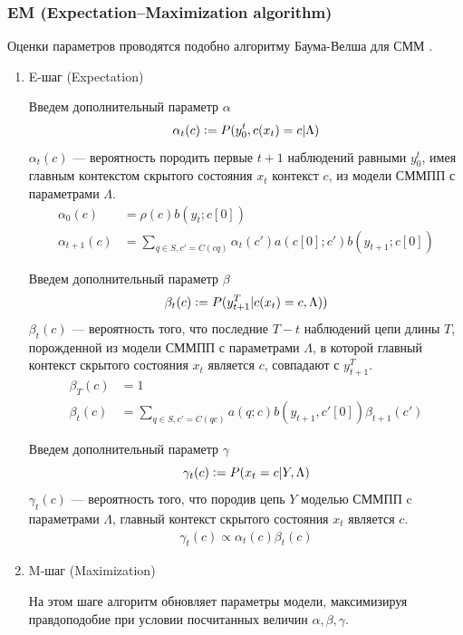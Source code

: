 \documentclass{matmex-diploma-custom}
\begin{document}
\subsubsection{EM (Expectation–Maximization algorithm)}
Оценки параметров проводятся подобно алгоритму Баума-Велша для СММ \cite{Rabiner1989}.
\begin{enumerate}
\item E-шаг (Expectation)

Введем дополнительный параметр $\alpha$
$$ \alpha_{t}(c) \mathrel{\mathop:}= P(y_{0}^{t}, c(x_{t})=c| \Lambda)$$
$\alpha_{t}(c)$ --- вероятность породить первые $t+1$ наблюдений равными $y_{0}^{t}$, имея главным контекстом  скрытого состояния $x_{t}$ контекст $ c $, из модели СММПП с параметрами $\Lambda$.
\begin{align}
\alpha_{0}(c) &= \rho(c)b(y_{t}; c[0]) \nonumber \\
\alpha_{t+1}(c) &= \sum_{q \in S, c'=C(cq)}{\alpha_{t}(c')a(c[0];c')b(y_{t+1}; c[0])}
\label{formula:alpha}
\end{align}

Введем дополнительный параметр $\beta$
$$ \beta_{t}(c) \mathrel{\mathop:}= P(y_{t+1}^{T}| c(x_{t})=c, \Lambda))$$
$\beta_{t}(c)$ --- вероятность того, что последние $T-t$ наблюдений цепи длины $T$, порожденной из модели СММПП с параметрами $\Lambda$, в которой главный контекст скрытого состояния $x_{t}$ является $ c $, совпадают с $y_{t+1}^{T}$.
\begin{align}
\beta_{T}(c) &= 1 \nonumber \\
\beta_{t}(c) &= \sum_{q \in S, c'=C(qc)}{a(q;c)b(y_{t+1}, c'[0])\beta_{t+1}(c')}
\label{formula:beta}
\end{align}

Введем дополнительный параметр $\gamma$
$$ \gamma_{t}(c) \mathrel{\mathop:}= P(x_{t}=c|Y,\Lambda) $$ 
$\gamma_{t}(c)$ --- вероятность того, что породив цепь $Y$ моделью СММПП c параметрами $\Lambda$,
главный контекст скрытого состояния $ x_{t} $ является $c$.
\begin{align}
\gamma_{t}(c) \propto {\alpha_{t}(c)\beta_{t}(c)}
\label{formula:gamma}
\end{align}

\item M-шаг (Maximization)

На этом шаге алгоритм обновляет параметры модели, максимизируя правдоподобие при условии посчитанных величин $\alpha, \beta, \gamma$.


\end{enumerate}
\end{document}
